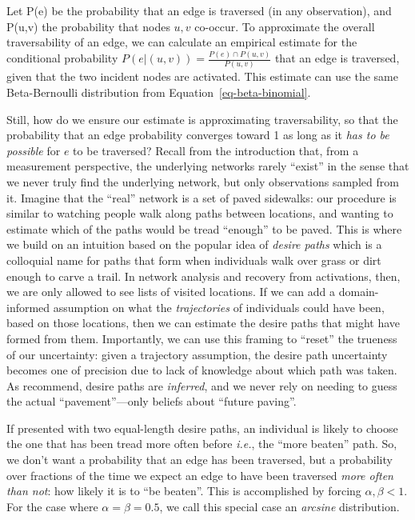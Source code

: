 \documentclass[%
	12pt,
		oneside,
		letterpaper
]{book}
\begin{document}
Let P(e) be the probability that an edge is traversed (in any observation), and P(u,v) the probability that nodes \(u,v\) co-occur.
To approximate the overall traversability of an edge, we can calculate an empirical estimate for the conditional probability \(P(e|(u,v))=\frac{P(e)\cap P(u,v)}{P(u,v)}\) that an edge is traversed, given that the two incident nodes are activated.
This estimate can use the same Beta-Bernoulli distribution from Equation~\ref{eq-beta-binomial}.

Still, how do we ensure our estimate is approximating traversability, so that the probability that an edge probability converges toward 1 as long as it \emph{has to be possible} for \(e\) to be traversed?
Recall from the introduction that, from a measurement perspective, the underlying networks rarely ``exist'' in the sense that we never truly find the underlying network, but only observations sampled from it.
Imagine that the ``real'' network is a set of paved sidewalks: our procedure is similar to watching people walk along paths between locations, and wanting to estimate which of the paths would be tread ``enough'' to be paved.
This is where we build on an intuition based on the popular idea of \emph{desire paths} which is a colloquial name for paths that form when individuals walk over grass or dirt enough to carve a trail.
In network analysis and recovery from activations, then, we are only allowed to see lists of visited locations.
If we can add a domain-informed assumption on what the \emph{trajectories} of individuals could have been, based on those locations, then we can estimate the desire paths that might have formed from them.
Importantly, we can use this framing to ``reset'' the trueness of our uncertainty: given a trajectory assumption, the desire path uncertainty becomes one of precision due to lack of knowledge about which path was taken.
As \textcite{Statisticalinferencelinks_Peel2022} recommend, desire paths are \emph{inferred}, and we never rely on needing to guess the actual ``pavement''---only beliefs about ``future paving''.

If presented with two equal-length desire paths, an individual is likely to choose the one that has been tread more often before \emph{i.e.}, the ``more beaten'' path.
So, we don't want a probability that an edge has been traversed, but a probability over fractions of the time we expect an edge to have been traversed \emph{more often than not}: how likely it is to ``be beaten''.
This is accomplished by forcing \(\alpha, \beta < 1\).
For the case where \(\alpha=\beta=0.5\), we call this special case an \emph{arcsine} distribution.
\end{document}
